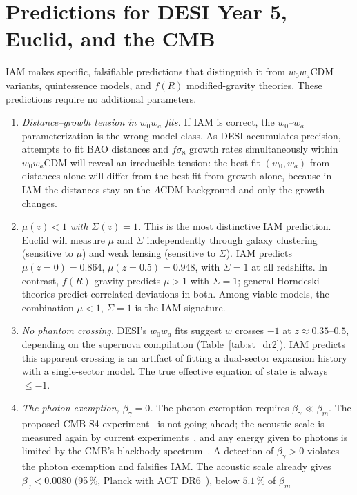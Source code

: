 \section{Predictions for DESI Year 5, Euclid, and the CMB}\label{sec:th:predictions}
IAM makes specific, falsifiable predictions that distinguish it from $w_0w_a$CDM variants, quintessence models, and $f(R)$ modified-gravity theories.
These predictions require no additional parameters. \prediction
\begin{enumerate}
\item \emph{Distance--growth tension in $w_0w_a$ fits.} If IAM is correct, the $w_0$--$w_a$ parameterization is the wrong model class. As DESI accumulates
precision, attempts to fit BAO distances and $f\sigma_8$ growth rates simultaneously within $w_0w_a$CDM will reveal an irreducible tension: the best-fit
$(w_0,w_a)$ from distances alone will differ from the best fit from growth alone, because in IAM the distances stay on the $\Lambda$CDM background and only the
growth changes.
\item \emph{$\mu(z)<1$ with $\Sigma(z)=1$.} This is the most distinctive IAM prediction. Euclid will measure $\mu$ and $\Sigma$ independently through
galaxy clustering (sensitive to $\mu$) and weak lensing (sensitive to $\Sigma$). IAM predicts $\mu(z{=}0)=0.864$, $\mu(z{=}0.5)=0.948$, with $\Sigma=1$ at
all redshifts. In contrast, $f(R)$ gravity predicts $\mu>1$ with $\Sigma=1$; general Horndeski theories predict correlated deviations in both. Among
viable models, the combination $\mu<1$, $\Sigma=1$ is the IAM signature.
\item \emph{No phantom crossing.} DESI's $w_0w_a$ fits suggest $w$ crosses $-1$ at $z\approx0.35$--$0.5$, depending on the supernova compilation (Table~\ref{tab:st_dr2}). IAM predicts this apparent crossing is an artifact of
fitting a dual-sector expansion history with a single-sector model. The true effective equation of state is always $\le-1$.
\item \emph{The photon exemption, $\beta_\gamma=0$.} The photon exemption requires $\beta_\gamma\ll\beta_m$. The proposed CMB-S4 experiment~\cite{Abazajian2016} is not going ahead;
the acoustic scale is measured again by current experiments~\cite{Rosenberg2022,Aiola2020,Ade2019SO}, and any energy given to photons is limited by the CMB's blackbody spectrum~\cite{Mather1994}. A detection of $\beta_\gamma>0$ violates the photon
exemption and falsifies IAM. The acoustic scale already gives $\beta_\gamma<0.0080$ (95\,\%, Planck with ACT DR6~\cite{Louis2025ACT}), below $5.1\,\%$ of $\beta_m$

\end{enumerate}
